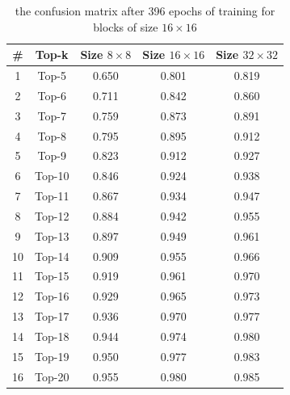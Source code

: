 \begin{table}
    \caption{the confusion
matrix after 396 epochs of training for blocks
of size \(16\times16\)}
    \bigskip\label{tab:valprecision}
    \centering
    \begin{tabular}{c c c c c}
        \toprule
        \# & Top-k & Size \(8\times8\) & Size \(16\times16\) & Size \(32\times32\) \\
        \midrule
        1 & Top-5 & 0.650     & 0.801  & 0.819 \\
        2 & Top-6  & 0.711    & 0.842  & 0.860 \\
        3 & Top-7  & 0.759    & 0.873  & 0.891 \\
        4 & Top-8  & 0.795    & 0.895  & 0.912 \\
        5 & Top-9  & 0.823    & 0.912  & 0.927 \\
        6 & Top-10  & 0.846   & 0.924   & 0.938 \\
        7 & Top-11  & 0.867   & 0.934   & 0.947 \\
        8 & Top-12  & 0.884   & 0.942   & 0.955 \\
        9 & Top-13  & 0.897   & 0.949   & 0.961 \\
        10 & Top-14  & 0.909  & 0.955   & 0.966 \\
        11 & Top-15  & 0.919  & 0.961   & 0.970 \\
        12 & Top-16  & 0.929  & 0.965   & 0.973 \\
        13 & Top-17  & 0.936  & 0.970   & 0.977 \\
        14 & Top-18  & 0.944  & 0.974   & 0.980 \\
        15 & Top-19  & 0.950  & 0.977   & 0.983 \\
        16 & Top-20  & 0.955  & 0.980   & 0.985 \\
        \bottomrule
    \end{tabular}
\end{table}

